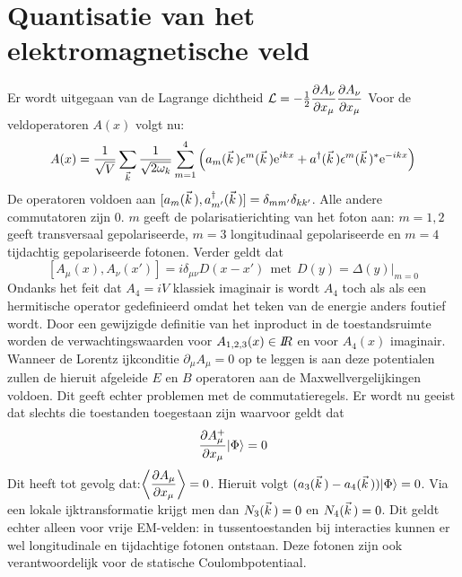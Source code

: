 \documentclass[twoside]{report}
\begin{document}
\section[~~Quantisatie van het elektromagnetische veld]{Quantisatie van het elektromagnetische veld}
Er wordt uitgegaan van de Lagrange dichtheid
$\displaystyle{\cal L}=-\mbox{$\frac{1}{2}$}\frac{\partial A_\nu}{\partial x_\mu}\frac{\partial A_\nu}{\partial x_\mu}$
\npar
Voor de veldoperatoren $A(x)$ volgt nu:
\[
A(x)=\frac{1}{\sqrt{V}}\sum_{\vec{k}}\frac{1}{\sqrt{2\omega_k}}\sum_{m=1}^4
\left(a_m(\vec{k}\,)\epsilon^m(\vec{k}\,){\rm e}^{ikx}+
a^\dagger(\vec{k}\,)\epsilon^m(\vec{k}\,)^*{\rm e}^{-ikx}\right)
\]
De operatoren voldoen aan
$[a_m(\vec{k}\,),a_{m'}^\dagger(\vec{k}\,)]=\delta_{mm'}\delta_{kk'}$. Alle andere
commutatoren zijn 0. $m$ geeft de polarisatierichting van het foton aan:
$m=1,2$ geeft transversaal gepolariseerde, $m=3$ longitudinaal gepolariseerde
en $m=4$ tijdachtig gepolariseerde fotonen. Verder geldt dat
\[
[A_\mu(x),A_\nu(x')]=i\delta_{\mu\nu}D(x-x')~~\mbox{met}~~D(y)=\Delta(y)|_{m=0}
\]
Ondanks het feit dat $A_4=iV$ klassiek imaginair is wordt $A_4$ toch als
als een hermitische operator gedefinieerd omdat het teken van de energie
anders foutief wordt. Door een gewijzigde definitie van het inproduct in de
toestandsruimte worden de verwachtingswaarden voor $A_{1,2,3}(x)\in I\hspace{-1mm}R$ en
voor $A_4(x)$ imaginair.
\npar
Wanneer de Lorentz ijkconditie $\partial_\mu A_\mu=0$ op te leggen is aan
deze potentialen zullen de hieruit afgeleide $E$ en $B$ operatoren aan de
Maxwellvergelijkingen voldoen. Dit geeft echter problemen met de
commutatieregels. Er wordt nu geeist dat slechts die toestanden toegestaan
zijn waarvoor geldt dat
\[
\frac{\partial A^+_\mu}{\partial x_\mu}|\Phi\rangle=0
\]
Dit heeft tot gevolg dat:\hspace{3cm}$\displaystyle\left\langle \frac{\partial A_\mu}{\partial x_\mu} \right\rangle=0$.
\npar
Hieruit volgt $(a_3(\vec{k}\,)-a_4(\vec{k}\,))|\Phi\rangle=0$. Via een lokale
ijktransformatie krijgt men dan $N_3(\vec{k}\,)=0$ en $N_4(\vec{k}\,)=0$. Dit
geldt echter alleen voor vrije EM-velden: in tussentoestanden bij interacties
kunnen er wel longitudinale en tijdachtige fotonen ontstaan. Deze fotonen
zijn ook verantwoordelijk voor de statische Coulombpotentiaal.
\end{document}
